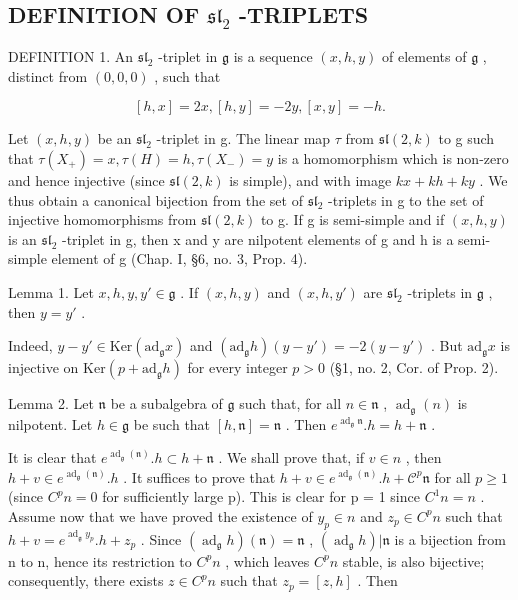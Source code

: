 \subsection{\texorpdfstring{DEFINITION OF \(\mathfrak{sl}_2\) -TRIPLETS}{DEFINITION OF \textbackslash mathfrak\{sl\}\_2 -TRIPLETS}}

DEFINITION 1. An \(\mathfrak{sl}_2\) -triplet in \(\mathfrak{g}\) is a sequence \((x, h, y)\) of elements of \(\mathfrak{g}\) , distinct from \((0, 0, 0)\) , such that

\[
[ h, x ] = 2 x, [ h, y ] = - 2 y, [ x, y ] = - h.
\]

Let \((x,h,y)\) be an \(\mathfrak{sl}_{2}\) -triplet in g. The linear map \(\tau\) from \(\mathfrak{sl}(2,k)\) to g such that \(\tau(X_{+}) = x, \tau(H) = h, \tau(X_{-}) = y\) is a homomorphism which is non-zero and hence injective (since \(\mathfrak{sl}(2,k)\) is simple), and with image \(kx + kh + ky\) . We thus obtain a canonical bijection from the set of \(\mathfrak{sl}_{2}\) -triplets in g to the set of injective homomorphisms from \(\mathfrak{sl}(2,k)\) to g. If g is semi-simple and if \((x,h,y)\) is an \(\mathfrak{sl}_{2}\) -triplet in g, then x and y are nilpotent elements of g and h is a semi-simple element of g (Chap. I, §6, no. 3, Prop. 4).

Lemma 1. Let \(x, h, y, y' \in \mathfrak{g}\) . If \((x, h, y)\) and \((x, h, y')\) are \(\mathfrak{sl}_2\) -triplets in \(\mathfrak{g}\) , then \(y = y'\) .

Indeed, \(y - y' \in \mathrm{Ker}(\mathrm{ad}_{\mathfrak{g}}x)\) and \((\mathrm{ad}_{\mathfrak{g}}h)(y - y') = -2(y - y')\) . But \(\mathrm{ad}_{\mathfrak{g}}x\) is injective on \(\mathrm{Ker}(p + \mathrm{ad}_{\mathfrak{g}}h)\) for every integer \(p > 0\) (§1, no. 2, Cor. of Prop. 2).

Lemma 2. Let \(\mathfrak{n}\) be a subalgebra of \(\mathfrak{g}\) such that, for all \(n\in \mathfrak{n}\) , \(\operatorname{ad}_{\mathfrak{g}}(n)\) is nilpotent. Let \(h\in \mathfrak{g}\) be such that \([h,\mathfrak{n}] = \mathfrak{n}\) . Then \(e^{\operatorname{ad}_{\mathfrak{g}}\mathfrak{n}}.h = h + \mathfrak{n}\) .

It is clear that \(e^{\operatorname{ad}_{\mathfrak{g}}(\mathfrak{n})}.h \subset h + \mathfrak{n}\) . We shall prove that, if \(v \in n\) , then \(h + v \in e^{\operatorname{ad}_{\mathfrak{g}}(\mathfrak{n})}.h\) . It suffices to prove that \(h + v \in e^{\operatorname{ad}_{\mathfrak{g}}(\mathfrak{n})}.h + \mathscr {C} ^ {p} \mathfrak {n}\) for all \(p \geq 1\) (since \(C^{p}n = 0\) for sufficiently large p). This is clear for p = 1 since \(C^{1}n = n\) . Assume now that we have proved the existence of \(y_{p} \in n\) and \(z_{p} \in C^{p}n\) such that \(h + v = e^{\operatorname{ad}_{\mathfrak{g}}y_{p}}.h + z_{p}\) . Since \((\operatorname{ad}_{\mathfrak{g}}h)(\mathfrak{n}) = \mathfrak{n}\) , \((\operatorname{ad}_{\mathfrak{g}}h)|\mathfrak{n}\) is a bijection from n to n, hence its restriction to \(C^{p}n\) , which leaves \(C^{p}n\) stable, is also bijective; consequently, there exists \(z \in C^{p}n\) such that \(z_{p} = [z, h]\) . Then

